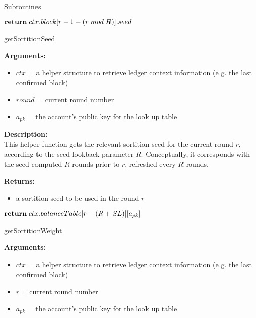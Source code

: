 \documentclass[10pt,a4paper]{article}
\begin{document}
\begin{section}{Subroutines}
\begin{algorithm}[H]
    \begin{algorithmic}[1]
        
            $\Return\;ctx.block[r-1-(r\;mod\;R)].seed$

        \EndFunction
    \end{algorithmic}
    \caption{\underline{getSortitionSeed}}
\end{algorithm}

\noindent \textbf{Arguments:}
\begin{itemize}
    \item $ctx$ = a helper structure to retrieve ledger context information (e.g. the last confirmed block)
    \item $round$ = current round number
    \item $a_{pk}$ = the account's public key for the look up table
  \end{itemize}


\noindent \textbf{Description:}\\
This helper function gets the relevant sortition seed for the current round $r$, according to the seed lookback parameter $R$.
Conceptually, it corresponds with the seed computed $R$ rounds prior to $r$, refreshed every $R$ rounds.

\noindent \textbf{Returns:}
\begin{itemize}
    \item a sortition seed to be used in the round $r$
  \end{itemize}


\begin{algorithm}[H]
    \begin{algorithmic}[1]

            $\Return\;ctx.balanceTable[r - (R + SL)][a_{pk}]$

        \EndFunction
    \end{algorithmic}
    \caption{\underline{getSortitionWeight}}
\end{algorithm}

\noindent \textbf{Arguments:}
\begin{itemize}
    \item $ctx$ = a helper structure to retrieve ledger context information (e.g. the last confirmed block)
    \item $r$ = current round number
    \item $a_{pk}$ = the account's public key for the look up table
  \end{itemize}



\end{section}
\end{document}
